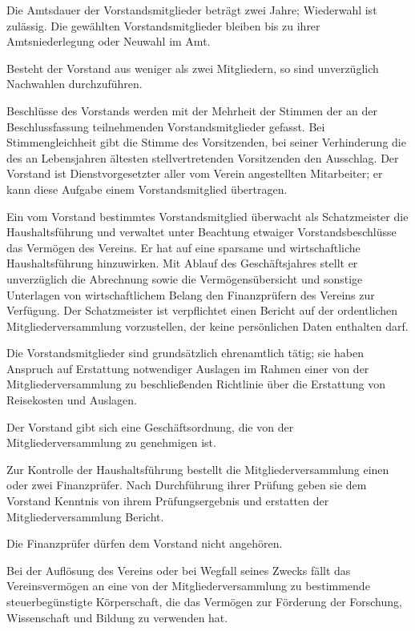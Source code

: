 \documentclass[12pt,ngerman]{scrartcl}
\begin{document}
\begin{contract}
Die Amtsdauer der Vorstandsmitglieder beträgt zwei Jahre; Wiederwahl ist zulässig. Die gewählten Vorstandsmitglieder bleiben bis zu ihrer Amtsniederlegung oder Neuwahl im Amt.

Besteht der Vorstand aus weniger als zwei Mitgliedern, so sind unverzüglich Nachwahlen durchzuführen.

Beschlüsse des Vorstands werden mit der Mehrheit der Stimmen der an der Beschlussfassung teilnehmenden Vorstandsmitglieder gefasst. Bei Stimmengleichheit gibt die Stimme des Vorsitzenden, bei seiner Verhinderung die des an Lebensjahren ältesten stellvertretenden Vorsitzenden den Ausschlag. Der Vorstand ist Dienstvorgesetzter aller vom Verein angestellten Mitarbeiter; er kann diese Aufgabe einem Vorstandsmitglied übertragen.

Ein vom Vorstand bestimmtes Vorstandsmitglied überwacht als Schatzmeister die Haushaltsführung und verwaltet unter Beachtung etwaiger Vorstandsbeschlüsse das Vermögen des Vereins. Er hat auf eine sparsame und wirtschaftliche Haushaltsführung hinzuwirken. Mit Ablauf des Geschäftsjahres stellt er unverzüglich die Abrechnung sowie die Vermögensübersicht und sonstige Unterlagen von wirtschaftlichem Belang den Finanzprüfern des Vereins zur Verfügung. Der Schatzmeister ist verpflichtet einen Bericht auf der ordentlichen Mitgliederversammlung vorzustellen, der keine persönlichen Daten enthalten darf.

Die Vorstandsmitglieder sind grundsätzlich ehrenamtlich tätig; sie haben Anspruch auf Erstattung notwendiger Auslagen im Rahmen einer von der Mitgliederversammlung zu beschließenden Richtlinie über die Erstattung von Reisekosten und Auslagen.

Der Vorstand gibt sich eine Geschäftsordnung, die von der Mitgliederversammlung zu genehmigen ist.



Zur Kontrolle der Haushaltsführung bestellt die Mitgliederversammlung einen oder zwei Finanzprüfer. Nach Durchführung ihrer Prüfung geben sie dem Vorstand Kenntnis von ihrem Prüfungsergebnis und erstatten der Mitgliederversammlung Bericht.

Die Finanzprüfer dürfen dem Vorstand nicht angehören.


Bei der Auflösung des Vereins oder bei Wegfall seines Zwecks fällt das Vereinsvermögen an eine von der Mitgliederversammlung zu bestimmende steuerbegünstigte Körperschaft, die das Vermögen zur Förderung der Forschung, Wissenschaft und Bildung zu verwenden hat.



\end{contract}
\end{document}
